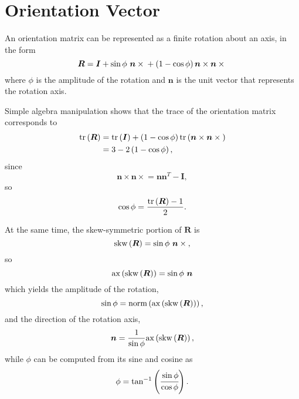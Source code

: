 \documentclass[10pt,dvips,fleqn]{report}
\newcommand{\T}[1]{\boldsymbol{#1}}
\begin{document}
\section{Orientation Vector}
An orientation matrix can be represented as a finite rotation about 
an axis, in the form
\begin{equation}
	\T{R} = \T{I}
	+ \sin\phi \ \T{n}\times{}
	+ \plbr{1 - \cos\phi} \T{n}\times\T{n}\times{}
\end{equation}
where $\phi$ is the amplitude of the rotation and $\T{n}$ 
is the unit vector that represents the rotation axis.

Simple algebra manipulation shows that the trace of the orientation matrix
corresponds to 
\begin{align}
	\mathrm{tr}\plbr{\T{R}}
	&= \mathrm{tr}\plbr{\T{I}}
	+ \plbr{1 - \cos\phi}\mathrm{tr}\plbr{\T{n}\times\T{n}\times{}} \\
	&= 3 - 2 \plbr{1 - \cos\phi} ,
\end{align}
since
\begin{equation}
	\T{n}\times\T{n}\times{} = \T{n} \T{n}^T - \T{I} ,
\end{equation}
so
\begin{equation}
	\cos\phi = \frac{\mathrm{tr}\plbr{\T{R}} - 1}{2} .
\end{equation}

At the same time, the skew-symmetric portion of $\T{R}$ is
\begin{equation}
	\mathrm{skw}\plbr{\T{R}} = \sin\phi \ \T{n}\times{} ,
\end{equation}
so
\begin{equation}
	\mathrm{ax}\plbr{\mathrm{skw}\plbr{\T{R}}} = \sin\phi \ \T{n}
\end{equation}
which yields the amplitude of the rotation,
\begin{equation}
	\sin\phi
	= \mathrm{norm}\plbr{\mathrm{ax}\plbr{\mathrm{skw}\plbr{\T{R}}}} ,
\end{equation}
and the direction of the rotation axis,
\begin{equation}
	\T{n} = \frac{1}{\sin\phi}\mathrm{ax}\plbr{\mathrm{skw}\plbr{\T{R}}} ,
\end{equation}
while $\phi$ can be computed from its sine and cosine as
\begin{equation}
	\phi = \tan^{-1}\left( \cfrac{\sin\phi}{\cos\phi} \right) .
\end{equation}
\end{document}
